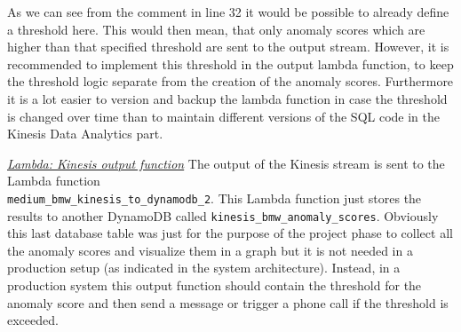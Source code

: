 \FloatBarrier
As we can see from the comment in line 32 it would be possible to already define a threshold here. This would then mean, that only anomaly scores which are higher than that specified threshold are sent to the output stream. However, it is recommended to implement this threshold in the output lambda function, to keep the threshold logic separate from the creation of the anomaly scores. Furthermore it is a lot easier to version and backup the lambda function in case the threshold is changed over time than to maintain different versions of the SQL code in the Kinesis Data Analytics part.

\textit{\underline{Lambda: Kinesis output function}}\break
The output of the Kinesis stream is sent to the Lambda function\\ \verb|medium_bmw_kinesis_to_dynamodb_2|. 
This Lambda function just stores the results to another DynamoDB called \verb|kinesis_bmw_anomaly_scores|. Obviously this last database table was just for the purpose of the project phase to collect all the anomaly scores and visualize them in a graph but it is not needed in a production setup (as indicated in the system architecture). Instead, in a production system this output function should contain the threshold for the anomaly score and then send a message or trigger a phone call if the threshold is exceeded.

